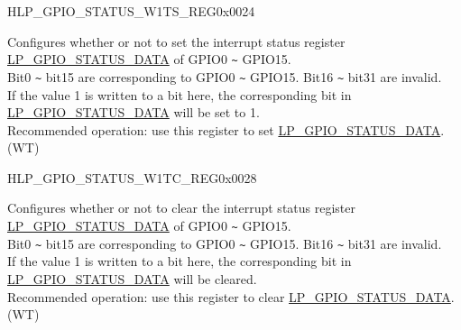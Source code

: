 \begin{register}{H}{LP\_GPIO\_STATUS\_W1TS\_REG}{0x0024}\label{regdesc:LPGPIOSTATUSW1TSREG}
%
%
\regnewline%
\begin{regdesc}\begin{reglist}
\label{fielddesc:LPGPIOSTATUSDATAW1TS}\item [LP\_GPIO\_STATUS\_DATA\_W1TS] Configures whether or not to set the interrupt status register \hyperref[fielddesc:LPGPIOSTATUSDATA]{LP\_GPIO\_STATUS\_DATA} of GPIO0 \verb+~+ GPIO15. \\
Bit0 \verb+~+ bit15 are corresponding to GPIO0 \verb+~+ GPIO15. Bit16 \verb+~+ bit31 are invalid.\\
If the value 1 is written to a bit here, the corresponding bit in \hyperref[fielddesc:LPGPIOSTATUSDATA]{LP\_GPIO\_STATUS\_DATA} will be set to 1. \\
Recommended operation: use this register to set \hyperref[fielddesc:LPGPIOSTATUSDATA]{LP\_GPIO\_STATUS\_DATA}. \\
(WT)
\end{reglist}\end{regdesc}
\end{register}


\begin{register}{H}{LP\_GPIO\_STATUS\_W1TC\_REG}{0x0028}\label{regdesc:LPGPIOSTATUSW1TCREG}
%
%
\regnewline%
\begin{regdesc}\begin{reglist}
\label{fielddesc:LPGPIOSTATUSDATAW1TC}\item [LP\_GPIO\_STATUS\_DATA\_W1TC]  Configures whether or not to clear the interrupt status register \hyperref[fielddesc:LPGPIOSTATUSDATA]{LP\_GPIO\_STATUS\_DATA} of GPIO0 \verb+~+ GPIO15. \\
Bit0 \verb+~+ bit15 are corresponding to GPIO0 \verb+~+ GPIO15. Bit16 \verb+~+ bit31 are invalid.\\
If the value 1 is written to a bit here, the corresponding bit in \hyperref[fielddesc:LPGPIOSTATUSDATA]{LP\_GPIO\_STATUS\_DATA} will be cleared. \\
Recommended operation: use this register to clear \hyperref[fielddesc:LPGPIOSTATUSDATA]{LP\_GPIO\_STATUS\_DATA}. \\(WT)
\end{reglist}\end{regdesc}
\end{register}


